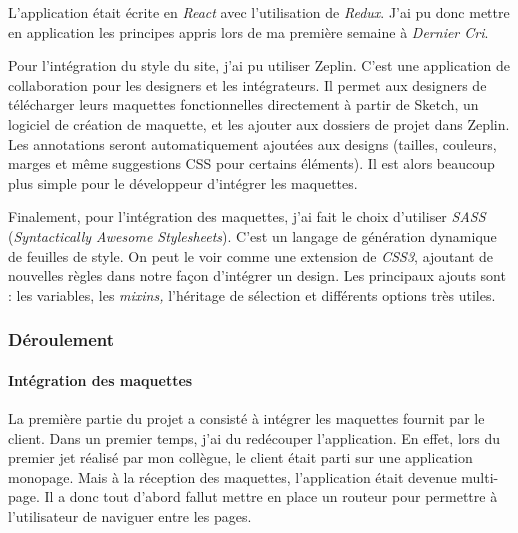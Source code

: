 \bigskip

L'application était écrite en \emph{React} avec l'utilisation de
\emph{Redux}. J'ai pu donc mettre en application les principes appris
lors de ma première semaine à \emph{Dernier Cri}.

\bigskip

Pour l'intégration du style du site, j'ai pu utiliser Zeplin. C'est une
application de collaboration pour les designers et les intégrateurs. Il
permet aux designers de télécharger leurs maquettes fonctionnelles
directement à partir de Sketch, un logiciel de création de maquette, et
les ajouter aux dossiers de projet dans Zeplin. Les annotations seront
automatiquement ajoutées aux designs (tailles, couleurs, marges et même
suggestions CSS pour certains éléments). Il est alors beaucoup plus
simple pour le développeur d'intégrer les maquettes.

\bigskip

Finalement, pour l'intégration des maquettes, j'ai fait le choix
d'utiliser \emph{SASS} (\emph{Syntactically Awesome Stylesheets}). C'est
un langage de génération dynamique de feuilles de style. On peut le voir
comme une extension de \emph{CSS3}, ajoutant de nouvelles règles dans
notre façon d'intégrer un design. Les principaux ajouts sont : les
variables, les \emph{mixins,} l'héritage de sélection et différents
options très utiles.

\bigskip

\subsubsection{Déroulement}\label{duxe9roulement}

\bigskip

\paragraph{Intégration des
maquettes}\label{intuxe9gration-des-maquettes}

\bigskip

La première partie du projet a consisté à intégrer les maquettes fournit
par le client. Dans un premier temps, j'ai du redécouper l'application.
En effet, lors du premier jet réalisé par mon collègue, le client était
parti sur une application monopage. Mais à la réception des maquettes,
l'application était devenue multi-page. Il a donc tout d'abord fallut
mettre en place un routeur pour permettre à l'utilisateur de naviguer
entre les pages.

